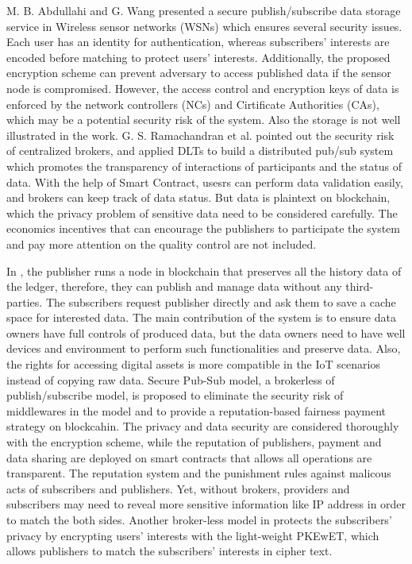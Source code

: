 \documentclass[conference]{IEEEtran}
\begin{document}
M. B. Abdullahi and G. Wang\cite{centralPubSub} presented a secure publish/subscribe data storage service in Wireless sensor networks (WSNs) which ensures several security issues. Each user has an identity for authentication, whereas subscribers' interests are encoded before matching to protect users' interests. Additionally, the proposed encryption scheme can prevent adversary to access published data if the sensor node is compromised. However, the access control and encryption keys of data is enforced by the network controllers (NCs) and Cirtificate Authorities (CAs), which may be a potential security risk of the system. Also the storage is not well illustrated in the work. G. S. Ramachandran et al.\cite{trinity} pointed out the security risk of centralized brokers, and applied DLTs to build a distributed pub/sub system which promotes the transparency of interactions of participants and the status of data. With the help of Smart Contract, usesrs can perform data validation easily, and brokers can keep track of data status. But data is plaintext on blockchain, which the privacy problem of sensitive data need to be considered carefully. The economics incentives that can encourage the publishers to participate the system and pay more attention on the quality control are not included. 

In \cite{userCentricData}, the publisher runs a node in blockchain that preserves all the history data of the ledger, therefore, they can publish and manage data without any third-parties. The subscribers request publisher directly and ask them to save a cache space for interested data. The main contribution of the system is to ensure data owners have full controls of produced data, but the data owners need to have well devices and environment to perform such functionalities and preserve data. Also, the rights for accessing digital assets is more compatible in the IoT scenarios instead of copying raw data. Secure Pub-Sub model\cite{SPS}, a brokerless of publish/subscribe model, is proposed to eliminate the security risk of middlewares in the model and to provide a reputation-based fairness payment strategy on blockcahin. The privacy and data security are considered thoroughly with the encryption scheme, while the reputation of publishers, payment and data sharing are deployed on smart contracts that allows all operations are transparent. The reputation system and the punishment rules against malicous acts of subscribers and publishers. Yet, without brokers, providers and subscribers may need to reveal more sensitive information like IP address in order to match the both sides. Another broker-less model in \cite{PrivacyPreservPubSub} protects the subscribers' privacy by encrypting users' interests with the light-weight PKEwET\cite{PKEwET}, which allows publishers to match the subscribers' interests in cipher text. 
\end{document}
